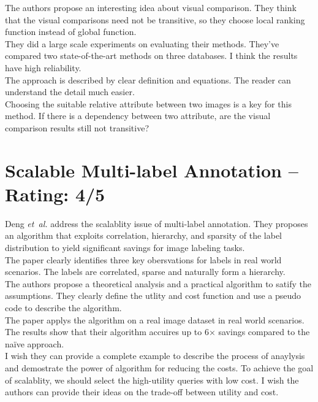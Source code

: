 \documentclass[a4paper]{article}
\begin{document}
The authors propose an interesting idea about visual comparison. They think that the visual comparisons need not be transitive, so they choose local ranking function instead of global function. \\

They did a large scale experiments on evaluating their methods. They've compared two state-of-the-art methods on three databases. I think the results have high reliability. \\

The approach is described by clear definition and equations. The reader can understand the detail much easier. \\

Choosing the suitable relative attribute between two images is a key for this method. If there is a dependency between two attribute, are the visual comparison results still not transitive?

\section{Scalable Multi-label Annotation -- Rating: 4/5}
Deng \emph{et~al.} \cite{Deng2014} address the scalablity issue of multi-label annotation. They proposes an algorithm that exploits correlation, hierarchy, and sparsity of the label distribution to yield significant savings for image labeling tasks.\\

The paper clearly identifies three key obersvations for labels in real world scenarios. The labels are correlated, sparse and naturally form a hierarchy.\\

The authors propose a theoretical analysis and a practical algorithm to satify the assumptions. They clearly define the utlity and cost function and use a pseudo code to describe the algorithm.\\

The paper applys the algorithm on a real image dataset in real world scenarios. The results show that their algorithm accuires up to 6× savings compared to the na\"{i}ve approach.\\

I wish they can provide a complete example to describe the process of anaylysis and demostrate the power of algorithm for reducing the costs. To achieve the goal of scalablity, we should select the high-utility queries with low cost. I wish the authors can provide their ideas on the trade-off between utility and cost.




\end{document}
